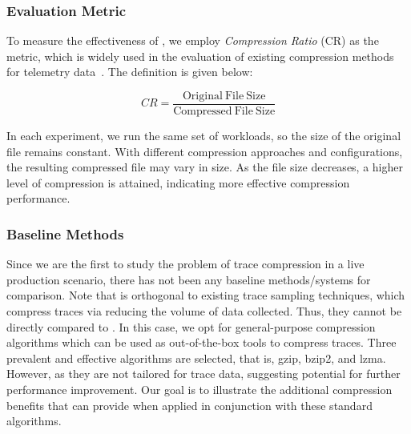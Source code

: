 

\subsubsection{Evaluation Metric}

To measure the effectiveness of \alias, we employ \textit{Compression Ratio} (CR) as the metric, which is widely used in the evaluation of existing compression methods for telemetry data~\cite{DBLP:conf/kbse/LiuZHHZL19,DBLP:conf/icse/LiZL024}.
The definition is given below:

\begin{equation*}
    CR=\frac{\mathrm{Original~File~Size}}{\mathrm{Compressed~File~Size}}
\end{equation*}

In each experiment, we run the same set of workloads, so the size of the original file remains constant.
With different compression approaches and configurations, the resulting compressed file may vary in size.
As the file size decreases, a higher level of compression is attained, indicating more effective compression performance.

\subsubsection{Baseline Methods}

Since we are the first to study the problem of trace compression in a live production scenario, there has not been any baseline methods/systems for comparison.
Note that \alias is orthogonal to existing trace sampling techniques, which compress traces via reducing the volume of data collected.
Thus, they cannot be directly compared to \alias.
In this case, we opt for general-purpose compression algorithms which can be used as out-of-the-box tools to compress traces.
Three prevalent and effective algorithms are selected, that is, gzip, bzip2, and lzma.
However, as they are not tailored for trace data, suggesting potential for further performance improvement.
Our goal is to illustrate the additional compression benefits that \alias can provide when applied in conjunction with these standard algorithms.

